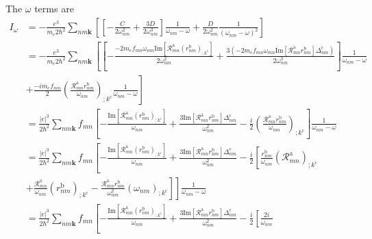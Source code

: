 The $\omega$ terms are
\begin{align}\label{pfia}
I_{\omega}
&=
-\frac{e^3}{m_e2\hbar^2}
\sum_{nm\mathbf{k}}
\left[
\left[
-\frac{C}{2\omega^2_{nm}}
+
\frac{3D}{2\omega^3_{nm}}
\right]\frac{1}{\omega_{nm}-\omega}
+
\frac{D}{2\omega^2_{nm}}\frac{1}{(\omega_{nm}-\omega)^2}
\right]
\nonumber\\
&=
-\frac{e^3}{m_e2\hbar^2}
\sum_{nm\mathbf{k}}
\left[
\left[
-\frac{-2m_ef_{mn}\omega_{mn}\mathrm{Im}[\mathcal{R}^{\mathrm{a}}_{mn}(r^{\mathrm{b}}_{nm})_{;k^{\mathrm{c}}}]
}{2\omega^2_{nm}}
+
\frac{3(-2m_ef_{mn}\omega_{mn}\mathrm{Im}[\mathcal{R}^{\mathrm{a}}_{mn}r^{\mathrm{b}}_{nm}]\Delta^{\mathrm{c}}_{nm})}{2\omega^3_{nm}}
\right]\frac{1}{\omega_{nm}-\omega}
\right.
\nonumber\\
&+
\left.
\frac{-im_ef_{mn}}{2}
\left(
\frac{\mathcal{R}^{\mathrm{a}}_{mn}r^{\mathrm{b}}_{nm}}{\omega_{nm}}
\right)_{;k^{\mathrm{c}}}
\frac{1}{\omega_{nm}-\omega}
\right]
\nonumber\\
&=
\frac{|e|^3}{2\hbar^2}
\sum_{nm\mathbf{k}}
f_{mn}
\left[
-\frac{\mathrm{Im}[\mathcal{R}^{\mathrm{a}}_{mn}(r^{\mathrm{b}}_{nm})_{;k^{\mathrm{c}}}]
}{\omega_{nm}}
+
\frac{3\mathrm{Im}[\mathcal{R}^{\mathrm{a}}_{mn}r^{\mathrm{b}}_{nm}]\Delta^{\mathrm{c}}_{nm}}{\omega^2_{nm}}
-
\frac{i}{2}
\left(
\frac{\mathcal{R}^{\mathrm{a}}_{mn}r^{\mathrm{b}}_{nm}}{\omega_{nm}}
\right)_{;k^{\mathrm{c}}}
\right]\frac{1}{\omega_{nm}-\omega}
\nonumber\\
&=
\frac{|e|^3}{2\hbar^2}
\sum_{nm\mathbf{k}}
f_{mn}
\left[
-\frac{\mathrm{Im}[\mathcal{R}^{\mathrm{a}}_{mn}(r^{\mathrm{b}}_{nm})_{;k^{\mathrm{c}}}]
}{\omega_{nm}}
+
\frac{3\mathrm{Im}[\mathcal{R}^{\mathrm{a}}_{mn}r^{\mathrm{b}}_{nm}]\Delta^{\mathrm{c}}_{nm}}{\omega^2_{nm}}
-
\frac{i}{2}
\left[
\frac{r^{\mathrm{b}}_{nm}}{\omega_{nm}}
\left(
\mathcal{R}^{\mathrm{a}}_{mn}
\right)_{;k^{\mathrm{c}}}
\right.
\right.
\nonumber\\
&+
\left.
\left.
\frac{\mathcal{R}^{\mathrm{a}}_{mn}}{\omega_{nm}}
\left(
r^{\mathrm{b}}_{nm}
\right)_{;k^{\mathrm{c}}}
-
\frac{\mathcal{R}^{\mathrm{a}}_{mn}r^{\mathrm{b}}_{nm}}{\omega^2_{nm}}
\left(
\omega_{nm}
\right)_{;k^{\mathrm{c}}}
\right]
\right]
\frac{1}{\omega_{nm}-\omega}
\nonumber\\
&=
\frac{|e|^3}{2\hbar^2}
\sum_{nm\mathbf{k}}
f_{mn}
\left[
-\frac{\mathrm{Im}[\mathcal{R}^{\mathrm{a}}_{mn}(r^{\mathrm{b}}_{nm})_{;k^{\mathrm{c}}}]
}{\omega_{nm}}
+
\frac{3\mathrm{Im}[\mathcal{R}^{\mathrm{a}}_{mn}r^{\mathrm{b}}_{nm}]\Delta^{\mathrm{c}}_{nm}}{\omega^2_{nm}}
-
\frac{i}{2}
\left[
\frac{2i}{\omega_{nm}}

\end{align}
